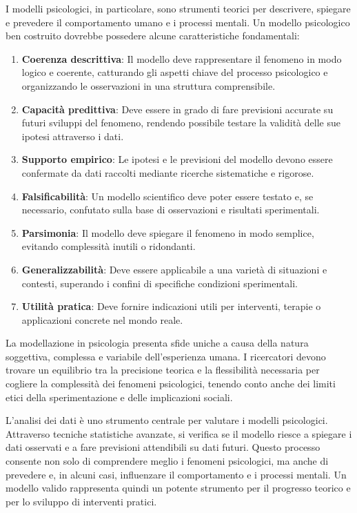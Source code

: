 \documentclass[
  letterpaper,
]{krantz}
\providecommand{\tightlist}{%
  \setlength{\itemsep}{0pt}\setlength{\parskip}{0pt}}\usepackage{longtable,booktabs,array}
\begin{document}
I modelli psicologici, in particolare, sono strumenti teorici per
descrivere, spiegare e prevedere il comportamento umano e i processi
mentali. Un modello psicologico ben costruito dovrebbe possedere alcune
caratteristiche fondamentali:

\begin{enumerate}
\def\labelenumi{\arabic{enumi}.}
\tightlist
\item
  \textbf{Coerenza descrittiva}: Il modello deve rappresentare il
  fenomeno in modo logico e coerente, catturando gli aspetti chiave del
  processo psicologico e organizzando le osservazioni in una struttura
  comprensibile.
\item
  \textbf{Capacità predittiva}: Deve essere in grado di fare previsioni
  accurate su futuri sviluppi del fenomeno, rendendo possibile testare
  la validità delle sue ipotesi attraverso i dati.
\item
  \textbf{Supporto empirico}: Le ipotesi e le previsioni del modello
  devono essere confermate da dati raccolti mediante ricerche
  sistematiche e rigorose.
\item
  \textbf{Falsificabilità}: Un modello scientifico deve poter essere
  testato e, se necessario, confutato sulla base di osservazioni e
  risultati sperimentali.
\item
  \textbf{Parsimonia}: Il modello deve spiegare il fenomeno in modo
  semplice, evitando complessità inutili o ridondanti.
\item
  \textbf{Generalizzabilità}: Deve essere applicabile a una varietà di
  situazioni e contesti, superando i confini di specifiche condizioni
  sperimentali.
\item
  \textbf{Utilità pratica}: Deve fornire indicazioni utili per
  interventi, terapie o applicazioni concrete nel mondo reale.
\end{enumerate}

La modellazione in psicologia presenta sfide uniche a causa della natura
soggettiva, complessa e variabile dell'esperienza umana. I ricercatori
devono trovare un equilibrio tra la precisione teorica e la flessibilità
necessaria per cogliere la complessità dei fenomeni psicologici, tenendo
conto anche dei limiti etici della sperimentazione e delle implicazioni
sociali.

L'analisi dei dati è uno strumento centrale per valutare i modelli
psicologici. Attraverso tecniche statistiche avanzate, si verifica se il
modello riesce a spiegare i dati osservati e a fare previsioni
attendibili su dati futuri. Questo processo consente non solo di
comprendere meglio i fenomeni psicologici, ma anche di prevedere e, in
alcuni casi, influenzare il comportamento e i processi mentali. Un
modello valido rappresenta quindi un potente strumento per il progresso
teorico e per lo sviluppo di interventi pratici.
\end{document}
